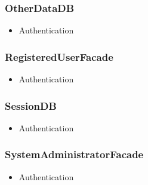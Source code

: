     \subsubsection{OtherDataDB}
        \begin{itemize}
            \item Authentication
        \end{itemize}

    \subsubsection{RegisteredUserFacade}
        \begin{itemize}
            \item Authentication
        \end{itemize}

    \subsubsection{SessionDB}
        \begin{itemize}
            \item Authentication
        \end{itemize}

    \subsubsection{SystemAdministratorFacade}
        \begin{itemize}
            \item Authentication
        \end{itemize}
